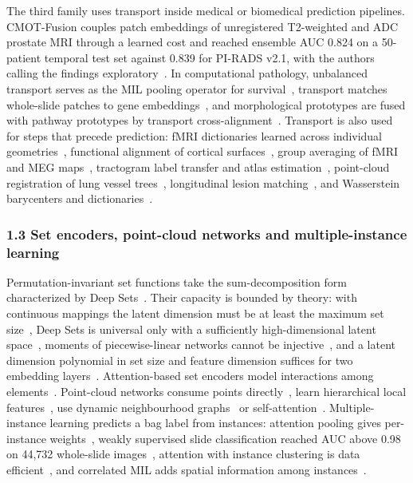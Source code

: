 \documentclass[journal,onecolumn]{IEEEtran}
\begin{document}
The third family uses transport inside medical or biomedical prediction pipelines. CMOT-Fusion couples patch embeddings of unregistered T2-weighted and ADC prostate MRI through a learned cost and reached ensemble AUC 0.824 on a 50-patient temporal test set against 0.839 for PI-RADS v2.1, with the authors calling the findings exploratory~\cite{Gong2026Robust}. In computational pathology, unbalanced transport serves as the MIL pooling operator for survival~\cite{Ren2025OTSurv}, transport matches whole-slide patches to gene embeddings~\cite{Xu2023Multimodal}, and morphological prototypes are fused with pathway prototypes by transport cross-alignment~\cite{Song2024Multimodal}. Transport is also used for steps that precede prediction: fMRI dictionaries learned across individual geometries~\cite{Mazelet2026Learning}, functional alignment of cortical surfaces~\cite{Thual2022Aligning}, group averaging of fMRI and MEG maps~\cite{Gramfort2015Fast}, tractogram label transfer and atlas estimation~\cite{Feydy2019Fast}, point-cloud registration of lung vessel trees~\cite{Shen2021Accurate}, longitudinal lesion matching~\cite{Qahqaie2026Unbalanced}, and Wasserstein barycenters and dictionaries~\cite{CuturiDoucet2014Fast,Schmitz2018Wasserstein,VincentCuaz2021Online}.

\subsubsection{1.3 Set encoders, point-cloud networks and multiple-instance learning}

Permutation-invariant set functions take the sum-decomposition form characterized by Deep Sets~\cite{Zaheer2017DeepSets}. Their capacity is bounded by theory: with continuous mappings the latent dimension must be at least the maximum set size~\cite{Wagstaff2019Limitations}, Deep Sets is universal only with a sufficiently high-dimensional latent space~\cite{Wagstaff2022Universal}, moments of piecewise-linear networks cannot be injective~\cite{Amir2023Injective}, and a latent dimension polynomial in set size and feature dimension suffices for two embedding layers~\cite{Wang2024PolynomialWidth}. Attention-based set encoders model interactions among elements~\cite{Lee2019SetTransformer}. Point-cloud networks consume points directly~\cite{Qi2017PointNet}, learn hierarchical local features~\cite{Qi2017PointNetPP}, use dynamic neighbourhood graphs~\cite{Wang2019DGCNN} or self-attention~\cite{Zhao2021PointTransformer}. Multiple-instance learning predicts a bag label from instances: attention pooling gives per-instance weights~\cite{Ilse2018AttentionMIL}, weakly supervised slide classification reached AUC above 0.98 on 44,732 whole-slide images~\cite{Campanella2019Clinical}, attention with instance clustering is data efficient~\cite{Lu2021CLAM}, and correlated MIL adds spatial information among instances~\cite{Shao2021TransMIL}.
\end{document}
